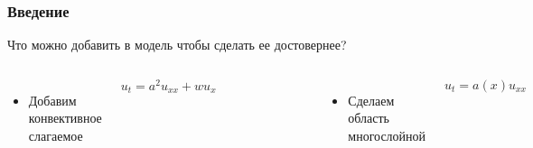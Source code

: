 \documentclass[10pt,pdf,hyperref={unicode}]{beamer}
\begin{document}
\begin{frame}
  \frametitle{Введение}
  Что можно добавить в модель чтобы сделать ее достовернее?
  \begin{columns}
    \begin{itemize}
      \item Добавим конвективное слагаемое
    \end{itemize}
    \begin{equation*}
      u_t = a^2 u_{xx} + w u_x
    \end{equation*}
      \begin{figure}[ht]
        \begin{center}
          \includegraphics[width=3cm]{int2.eps}
        \end{center}
      \end{figure}

    \pause
    \begin{itemize}
      \item Сделаем область многослойной
    \end{itemize}
    \begin{equation*}
      u_t = a(x) u_{xx}
    \end{equation*}
      \begin{figure}[ht]
        \begin{center}
          \includegraphics[width=3cm]{int3.eps}
        \end{center}
      \end{figure}
  \end{columns}
\end{frame}
\end{document}
